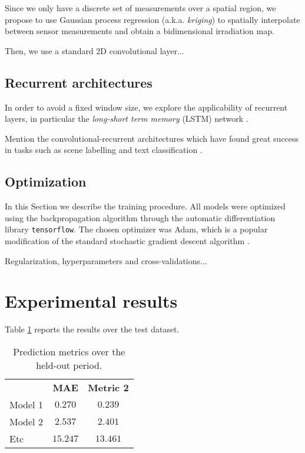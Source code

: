\documentclass[preprints,article,accept,moreauthors,pdftex]{template/mdpi}
\begin{document}
Since we only have a discrete set of measurements over a spatial region, we propose to use Gaussian process regression  \cite{rasmussen2003gaussian} (a.k.a. \emph{kriging}) to spatially interpolate between sensor measurements and obtain a bidimensional irradiation map.

Then, we use a standard 2D convolutional layer...



\subsection{Recurrent architectures}

In order to avoid a fixed window size, we explore the applicability of recurrent layers, in particular the \emph{long-short term memory} (LSTM) network \cite{gers1999learning}.

Mention the convolutional-recurrent architectures which have found great success in tasks such as scene labelling \cite{pinheiro2014recurrent} and text classification \cite{lai2015recurrent}.

\subsection{Optimization}

In this Section we describe the training procedure. All models were optimized using the backpropagation algorithm \cite{Rumelhart:1986:LIR:104279.104293} through the automatic differentiation library \texttt{tensorflow}. The chosen optimizer was Adam, which is a popular modification of the standard stochastic gradient descent algorithm \cite{kingma2014adam}.

Regularization, hyperparameters and cross-validations...


\section{Experimental results}\label{sec:results}

Table \ref{tbl:preds} reports the results over the test dataset.

\begin{table}[!ht]
\centering
\caption{Prediction metrics over the held-out period.}\label{tbl:preds}
\begin{tabular}{lcc}
\cline{1-3}
   & \textbf{MAE}                             & \textbf{Metric 2}   \\ 
 \cline{1-3}
    Model 1          & $0.270$ &  $0.239$ \\
    Model 2          & $2.537$ &  $2.401$ \\
    Etc & $15.247$ & $13.461$\\
 \cline{1-3}
\end{tabular}
\end{table}
\end{document}

